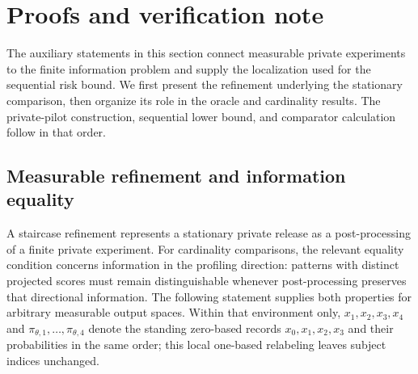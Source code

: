 \section{Proofs and verification note}
\label{sec:proofs}

The auxiliary statements in this section connect measurable private experiments to the finite information problem and supply the localization used for the sequential risk bound. We first present the refinement underlying the stationary comparison, then organize its role in the oracle and cardinality results. The private-pilot construction, sequential lower bound, and comparator calculation follow in that order.

\subsection{Measurable refinement and information equality}

A staircase refinement represents a stationary private release as a post-processing of a finite private experiment. For cardinality comparisons, the relevant equality condition concerns information in the profiling direction: patterns with distinct projected scores must remain distinguishable whenever post-processing preserves that directional information. The following statement supplies both properties for arbitrary measurable output spaces. Within that environment only, \(x_1,x_2,x_3,x_4\) and \(\pi_{\theta,1},\ldots,\pi_{\theta,4}\) denote the standing zero-based records \(x_0,x_1,x_2,x_3\) and their probabilities in the same order; this local one-based relabeling leaves subject indices unchanged.

